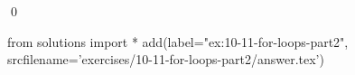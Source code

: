 
\begin{ex}
  \label{ex:10-11-for-loops-part2}
  
  \qed
\end{ex}
\begin{python0}
from solutions import *
add(label="ex:10-11-for-loops-part2",
    srcfilename='exercises/10-11-for-loops-part2/answer.tex')
\end{python0}
